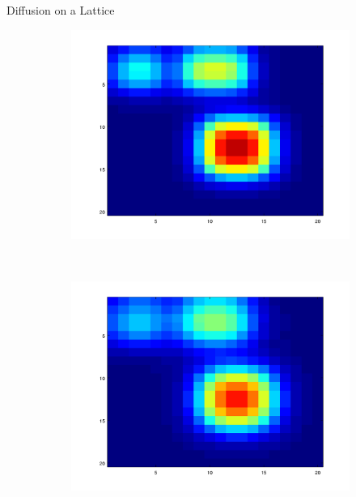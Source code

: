 \documentclass[10pt]{beamer}
\begin{document}
\begin{frame}{Diffusion on a Lattice}
\begin{figure}[!h]
\begin{subfigure}[b]{0.25\textwidth}
			\includegraphics[width= \textwidth]{images/anim_30.png}
		\end{subfigure}~
		\begin{subfigure}[b]{0.25\textwidth}
			\includegraphics[width= \textwidth]{images/anim_45.png}
		\end{subfigure}\\
		\begin{subfigure}[b]{0.25\textwidth}

\end{subfigure}
\end{figure}
\end{frame}
\end{document}
